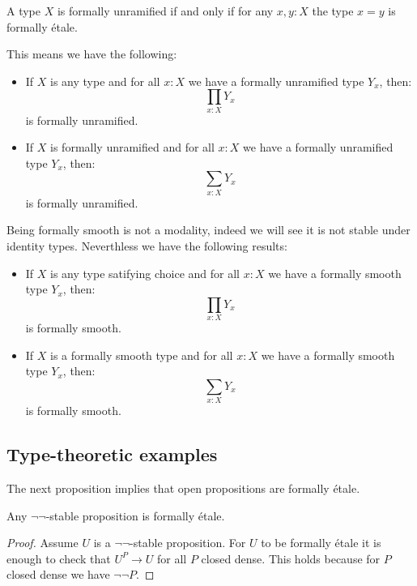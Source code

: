 \begin{lemma}
A type $X$ is formally unramified if and only if for any $x,y:X$ the type $x=y$ is formally étale.
\end{lemma}

This means we have the following:

\begin{proposition}
\begin{itemize}
\item If $X$ is any type and for all $x:X$ we have a formally unramified type $Y_x$, then:
\[\prod_{x:X}Y_x\]
is formally unramified. 
\item  If $X$ is formally unramified and for all $x:X$ we have a formally unramified type $Y_x$, then:
\[\sum_{x:X}Y_x\]
is formally unramified.
\end{itemize}
\end{proposition}

Being formally smooth is not a modality, indeed we will see it is not stable under identity types. Neverthless we have the following results:

\begin{lemma}\label{smooth-sigma-closed}
\begin{itemize}
\item If $X$ is any type satifying choice and for all $x:X$ we have a formally smooth type $Y_x$, then:
\[\prod_{x:X}Y_x\]
is formally smooth.
\item If $X$ is a formally smooth type and for all $x:X$ we have a formally smooth type $Y_x$, then:
\[\sum_{x:X}Y_x\]
is formally smooth.
\end{itemize}
\end{lemma}


\subsection{Type-theoretic examples}

The next proposition implies that open propositions are formally étale.

\begin{lemma}\label{not-not-stable-prop-etale}
  Any $\neg\neg$-stable proposition is formally étale.
\end{lemma}

\begin{proof}
  Assume $U$ is a $\neg\neg$-stable proposition. For $U$ to be formally étale it is enough to check that $U^P\to U$ for all $P$ closed dense. This holds because for $P$ closed dense we have $\neg\neg P$.
  \end{proof}
  
